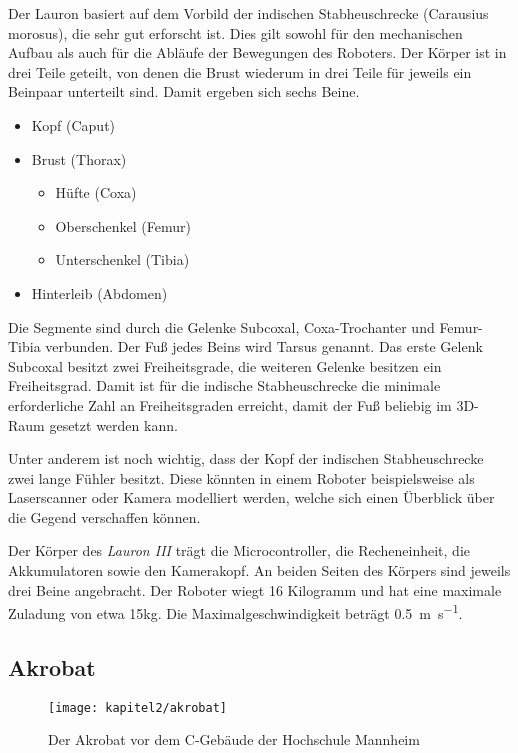 Der Lauron basiert auf dem Vorbild der indischen Stabheuschrecke (Carausius morosus), die sehr gut erforscht ist. Dies gilt sowohl für den mechanischen Aufbau als auch für die Abläufe der Bewegungen des Roboters. Der Körper ist in drei Teile geteilt, von denen die Brust wiederum in drei Teile für jeweils ein Beinpaar unterteilt sind. Damit ergeben sich sechs Beine.
\begin{itemize}
  \item Kopf (Caput)
  \item Brust (Thorax)
  \begin{itemize}
  \item Hüfte (Coxa)
  \item Oberschenkel (Femur)
  \item Unterschenkel (Tibia)
  \end{itemize}
  \item Hinterleib (Abdomen)
\end{itemize}

Die Segmente sind durch die Gelenke Subcoxal, Coxa-Trochanter und Femur-Tibia verbunden. Der Fuß jedes Beins wird Tarsus genannt. Das erste Gelenk Subcoxal besitzt zwei Freiheitsgrade, die weiteren Gelenke besitzen ein Freiheitsgrad. Damit ist für die indische Stabheuschrecke die minimale erforderliche Zahl an Freiheitsgraden erreicht, damit der Fuß beliebig im 3D-Raum gesetzt werden kann.

Unter anderem ist noch wichtig, dass der Kopf der indischen Stabheuschrecke zwei lange Fühler besitzt. Diese könnten in einem Roboter beispielsweise als Laserscanner oder Kamera modelliert werden, welche sich einen Überblick über die Gegend verschaffen können.

Der Körper des \emph{Lauron III} trägt die Microcontroller, die Recheneinheit, die Akkumulatoren sowie den Kamerakopf. An beiden Seiten des Körpers sind jeweils drei Beine angebracht. Der Roboter wiegt 16 Kilogramm und hat eine maximale Zuladung von etwa 15kg. Die Maximalgeschwindigkeit beträgt \SI{0.5}{\metre\per\second}. \autocite{gassmann2000} \autocite{troilo2007}

\subsection{Akrobat}

\begin{figure}[b]
  \centering
  \texttt{[image: kapitel2/akrobat]}
  \caption{Der Akrobat vor dem C-Gebäude der Hochschule Mannheim}
  \label{Kap2:akrobat}
\end{figure}




